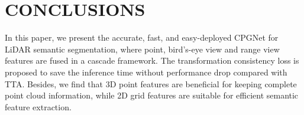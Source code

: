 \documentclass[letterpaper, 10 pt, conference]{ieeeconf}
\begin{document}
\section{CONCLUSIONS}
In this paper, we present the accurate, fast, and easy-deployed CPGNet for LiDAR semantic segmentation, where point, bird’s-eye view and range view features are fused in a cascade framework. The transformation consistency loss is proposed to save the inference time without performance drop compared with TTA. Besides, we find that 3D point features are beneficial for keeping complete point cloud information, while 2D grid features are suitable for efficient semantic feature extraction.







\end{document}
